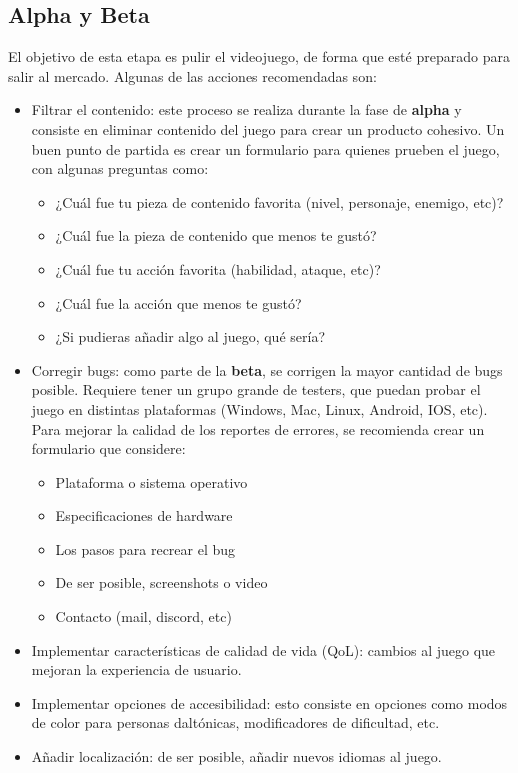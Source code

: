\subsection{Alpha y Beta}
El objetivo de esta etapa es pulir el videojuego, de forma que esté preparado para salir al mercado. Algunas de las acciones recomendadas son:
\begin{itemize}
  \item Filtrar el contenido: este proceso se realiza durante la fase de \textbf{alpha} y consiste en eliminar contenido del juego para crear un producto cohesivo. Un buen punto de partida es crear un formulario para quienes prueben el juego, con algunas preguntas como:
    \begin{itemize}
      \item ¿Cuál fue tu pieza de contenido favorita (nivel, personaje, enemigo, etc)?
      \item ¿Cuál fue la pieza de contenido que menos te gustó?
      \item ¿Cuál fue tu acción favorita (habilidad, ataque, etc)?
      \item ¿Cuál fue la acción que menos te gustó?
      \item ¿Si pudieras añadir algo al juego, qué sería?
    \end{itemize}
  \item Corregir bugs: como parte de la \textbf{beta}, se corrigen la mayor cantidad de bugs posible. Requiere tener un grupo grande de testers, que puedan probar el juego en distintas plataformas (Windows, Mac, Linux, Android, IOS, etc). Para mejorar la calidad de los reportes de errores, se recomienda crear un formulario que considere:
    \begin{itemize}
      \item Plataforma o sistema operativo
      \item Especificaciones de hardware
      \item Los pasos para recrear el bug
      \item De ser posible, screenshots o video
      \item Contacto (mail, discord, etc)
    \end{itemize}
  \item Implementar características de calidad de vida (QoL): cambios al juego que mejoran la experiencia de usuario.
  \item Implementar opciones de accesibilidad: esto consiste en opciones como modos de color para personas daltónicas, modificadores de dificultad, etc.
  \item Añadir localización: de ser posible, añadir nuevos idiomas al juego.
\end{itemize}
%
%
